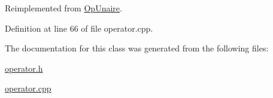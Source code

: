 Reimplemented from \hyperlink{class_op_unaire_a05586cb26efdcc8fa3aba5be681a71c8}{Op\+Unaire}.



Definition at line 66 of file operator.\+cpp.



The documentation for this class was generated from the following files\+:\begin{DoxyCompactItemize}
\item 
\hyperlink{operator_8h}{operator.\+h}\item 
\hyperlink{operator_8cpp}{operator.\+cpp}\end{DoxyCompactItemize}
